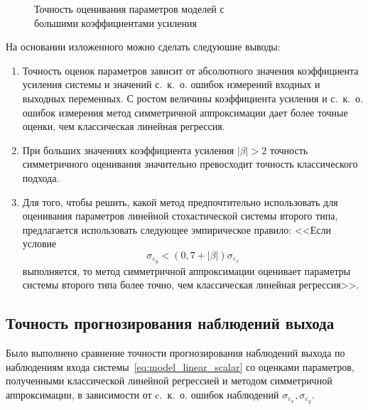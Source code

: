 \begin{figure}[p]
  \vspace{\baselineskip}
  \caption{%
    Точность оценивания параметров моделей с \\
    большими коэффициентами усиления
  }\label{fig:comparison_linear_params_beta-big}
\end{figure}

На основании изложенного можно сделать следуюшие выводы:
\begin{enumerate}
  \item Точность оценок параметров зависит от абсолютного значения коэффициента усиления системы и
    значений с.~к.~о. ошибок измерений входных и выходных переменных.
    С ростом величины коэффициента усиления и с.~к.~о. ошибок измерения
    метод симметричной аппроксимации дает более точные оценки,
    чем классическая линейная регрессия.
  \item При больших значениях коэффициента усиления \( |\beta| > 2 \)
    точность симметричного оценивания значительно превосходит
    точность классического подхода.
  \item Для того, чтобы решить, какой метод предпочтительно использовать для оценивания параметров
    линейной стохастической системы второго типа,
    предлагается использовать следующее эмпирическое правило:
    <<Если условие
    \begin{equation}
      \sigma_{\varepsilon_y} < (0{,}7 + |\beta|) \sigma_{\varepsilon_x}
      \label{eq:rule_linear_param}
    \end{equation}
    выполняется, то метод симметричной аппроксимации оценивает параметры системы
    второго типа более точно, чем классическая линейная регрессия>>.
\end{enumerate}

\newpage
\subsection{Точность прогнозирования наблюдений выхода}

Было выполнено сравнение точности прогнозирования наблюдений выхода по наблюдениям входа
системы~\eqref{eq:model_linear_scalar} со оценками параметров,
полученными классической линейной регрессией и методом симметричной аппроксимации,
в зависимости от c.~к.~о. ошибок наблюдений \( \sigma_{\varepsilon_x}, \sigma_{\varepsilon_y} \).

